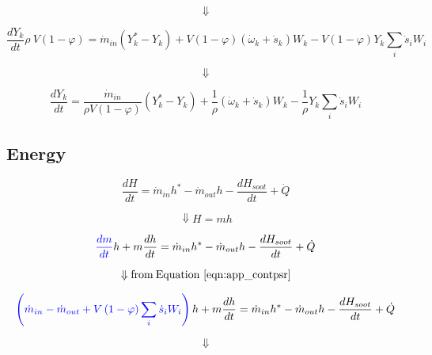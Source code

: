 \begin{equation*}
	\Downarrow
\end{equation*}

\begin{equation*}
	\frac{dY_k}{dt}\rho\ V\left(1-\varphi\right)={\dot{m}}_{in}\left(Y_k^\ast-Y_k\right)+V\left(1-\varphi\right)\left({\dot{\omega}}_k+{\dot{s}}_k\right)W_k-V\left(1-\varphi\right)Y_k\sum_{i}{{\dot{s}}_iW_i}
\end{equation*}

\begin{equation*}
	\Downarrow
\end{equation*}

\begin{equation}
	\frac{dY_k}{dt}=\frac{{\dot{m}}_{in}}{\rho V\left(1-\varphi\right)}\left(Y_k^\ast-Y_k\right)+\frac{1}{\rho}\left({\dot{\omega}}_k+{\dot{s}}_k\right)W_k-\frac{1}{\rho}Y_k\sum_{i}{{\dot{s}}_iW_i}
	\label{eqn:app_spiciespsr}
\end{equation}

\subsection{Energy}

\begin{equation*}
	\frac{dH}{dt}={\dot{m}}_{in}h^\ast-{\dot{m}}_{out}h-\frac{dH_{soot}}{dt}+\dot{Q}
\end{equation*}

\begin{equation*}
	\Downarrow H=mh
\end{equation*}


\begin{equation*}
	\color{blue}
	\frac{dm}{dt}
	\color{black}
	h+m\frac{dh}{dt}={\dot{m}}_{in}h^\ast-{\dot{m}}_{out}h-\frac{dH_{soot}}{dt}+\dot{Q}
\end{equation*}

\begin{equation*}
	\Downarrow \mathrm{from \: Equation~\ref{eqn:app_contpsr}}
\end{equation*}

\begin{equation*}
	\color{blue}
	\left(
		{\dot{m}}_{in}-{\dot{m}}_{out}
		+V\left(1-\varphi\right)\sum_{i}{{\dot{s}}_iW_i}
	\right)
	\color{black}h+m\frac{dh}{dt}={\dot{m}}_{in}h^\ast-{\dot{m}}_{out}h-\frac{dH_{soot}}{dt}+\dot{Q}
\end{equation*}

\begin{equation*}
	\Downarrow
\end{equation*}


